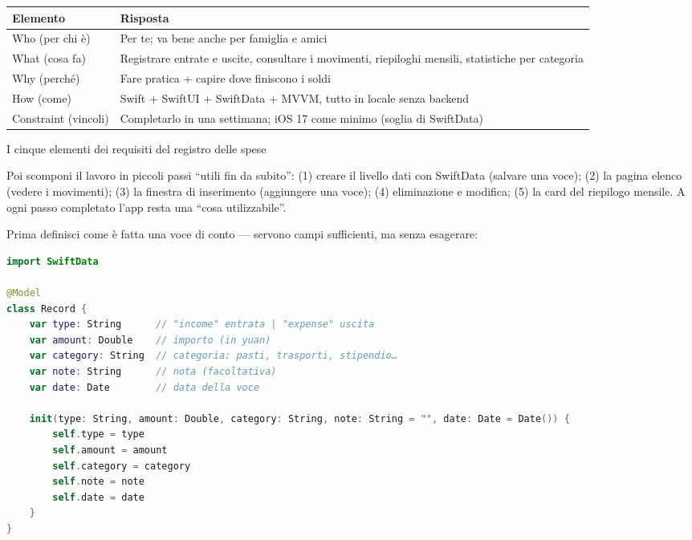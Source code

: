 


\begin{center}
\begin{tabularx}{\linewidth}{|X|X|}
\hline
\textbf{Elemento} & \textbf{Risposta} \tabularnewline
\hline
Who (per chi è) & Per te; va bene anche per famiglia e amici \tabularnewline
What (cosa fa) & Registrare entrate e uscite, consultare i movimenti, riepiloghi mensili, statistiche per categoria \tabularnewline
Why (perché) & Fare pratica + capire dove finiscono i soldi \tabularnewline
How (come) & Swift + SwiftUI + SwiftData + MVVM, tutto in locale senza backend \tabularnewline
Constraint (vincoli) & Completarlo in una settimana; iOS 17 come minimo (soglia di SwiftData) \tabularnewline
\hline
\end{tabularx}
\end{center}

\begin{center}\small\color{gray}I cinque elementi dei requisiti del registro delle spese\end{center}

Poi scomponi il lavoro in piccoli passi “utili fin da subito”: (1) creare il livello dati con SwiftData (salvare una voce); (2) la pagina elenco (vedere i movimenti); (3) la finestra di inserimento (aggiungere una voce); (4) eliminazione e modifica; (5) la card del riepilogo mensile. A ogni passo completato l'app resta una “cosa utilizzabile”.


Prima definisci come è fatta una voce di conto — servono campi sufficienti, ma senza esagerare:

\begin{lstlisting}[language=Swift]
import SwiftData

@Model
class Record {
    var type: String      // "income" entrata | "expense" uscita
    var amount: Double    // importo (in yuan)
    var category: String  // categoria: pasti, trasporti, stipendio…
    var note: String      // nota (facoltativa)
    var date: Date        // data della voce

    init(type: String, amount: Double, category: String, note: String = "", date: Date = Date()) {
        self.type = type
        self.amount = amount
        self.category = category
        self.note = note
        self.date = date
    }
}
\end{lstlisting}

